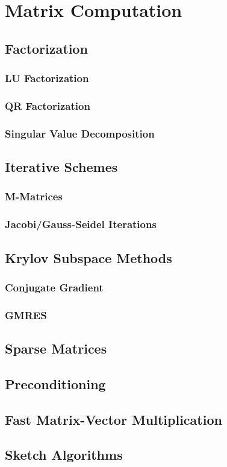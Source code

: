 \chapter{Matrix Computation}
\label{Ch: 8-Mat-Com}
\section{Factorization}
\subsection{LU Factorization}
\subsection{QR Factorization}
\subsection{Singular Value Decomposition}
\section{Iterative Schemes}
\subsection{M-Matrices}
\subsection{Jacobi/Gauss-Seidel Iterations}
\section{Krylov Subspace Methods}
\subsection{Conjugate Gradient}
\subsection{GMRES}
\section{Sparse Matrices}
\section{Preconditioning}

\section{Fast Matrix-Vector Multiplication}

\section{Sketch Algorithms}


